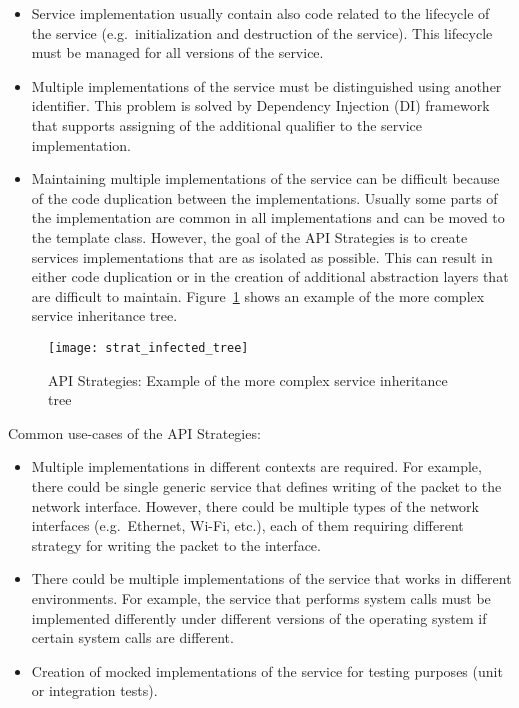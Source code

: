 \begin{itemize}
    \item Service implementation usually contain also code related to the lifecycle of the service
    (e.g.\ initialization and destruction of the service).
    This lifecycle must be managed for all versions of the service.
    \item Multiple implementations of the service must be distinguished using another identifier.
    This problem is solved by Dependency Injection (DI) framework that supports assigning of the additional qualifier
    to the service implementation.
    \item Maintaining multiple implementations of the service can be difficult because of the code duplication
    between the implementations.
    Usually some parts of the implementation are common in all implementations and can be moved to the template class.
    However, the goal of the API Strategies is to create services implementations that are as isolated as possible.
    This can result in either code duplication or in the creation of additional abstraction layers that are difficult
    to maintain.
    Figure~\ref{fig:strat_infected_tree} shows an example of the more complex service inheritance tree.
\end{itemize}

\begin{figure}[!htb]
    \centering
    \texttt{[image: strat\_infected\_tree]}
    \caption{API Strategies: Example of the more complex service inheritance tree}
    \label{fig:strat_infected_tree}
\end{figure}

Common use-cases of the API Strategies:

\begin{itemize}
    \item Multiple implementations in different contexts are required.
    For example, there could be single generic service that defines writing of the packet to the network interface.
    However, there could be multiple types of the network interfaces (e.g.\ Ethernet, Wi-Fi, etc.), each of them
    requiring different strategy for writing the packet to the interface.
    \item There could be multiple implementations of the service that works in different environments.
    For example, the service that performs system calls must be implemented differently under different
    versions of the operating system if certain system calls are different.
    \item Creation of mocked implementations of the service for testing purposes (unit or integration tests).
\end{itemize}
